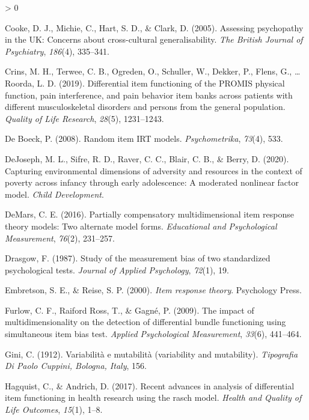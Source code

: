 \documentclass[
  english,
  man,floatsintext]{apa6}
\newlength{\cslhangindent}
\newenvironment{CSLReferences}[2] %
 {%
  \setlength{\parindent}{0pt}
  \ifodd #1 \everypar{\setlength{\hangindent}{\cslhangindent}}\ignorespaces\fi
  \ifnum #2 > 0
  \setlength{\parskip}{#2\baselineskip}
  \fi
 }%
 {}
\begin{document}
\begin{CSLReferences}{1}{0}
\leavevmode\hypertarget{ref-cooke2005assessing}{}%
Cooke, D. J., Michie, C., Hart, S. D., \& Clark, D. (2005). Assessing psychopathy in the UK: Concerns about cross-cultural generalisability. \emph{The British Journal of Psychiatry}, \emph{186}(4), 335--341.

\leavevmode\hypertarget{ref-crins2019differential}{}%
Crins, M. H., Terwee, C. B., Ogreden, O., Schuller, W., Dekker, P., Flens, G., \ldots{} Roorda, L. D. (2019). Differential item functioning of the PROMIS physical function, pain interference, and pain behavior item banks across patients with different musculoskeletal disorders and persons from the general population. \emph{Quality of Life Research}, \emph{28}(5), 1231--1243.

\leavevmode\hypertarget{ref-de2008random}{}%
De Boeck, P. (2008). Random item IRT models. \emph{Psychometrika}, \emph{73}(4), 533.

\leavevmode\hypertarget{ref-dejosephcapturing}{}%
DeJoseph, M. L., Sifre, R. D., Raver, C. C., Blair, C. B., \& Berry, D. (2020). Capturing environmental dimensions of adversity and resources in the context of poverty across infancy through early adolescence: A moderated nonlinear factor model. \emph{Child Development}.

\leavevmode\hypertarget{ref-demars2016partially}{}%
DeMars, C. E. (2016). Partially compensatory multidimensional item response theory models: Two alternate model forms. \emph{Educational and Psychological Measurement}, \emph{76}(2), 231--257.

\leavevmode\hypertarget{ref-drasgow1987study}{}%
Drasgow, F. (1987). Study of the measurement bias of two standardized psychological tests. \emph{Journal of Applied Psychology}, \emph{72}(1), 19.

\leavevmode\hypertarget{ref-embretson2013item}{}%
Embretson, S. E., \& Reise, S. P. (2000). \emph{Item response theory}. Psychology Press.

\leavevmode\hypertarget{ref-furlow2009impact}{}%
Furlow, C. F., Raiford Ross, T., \& Gagné, P. (2009). The impact of multidimensionality on the detection of differential bundle functioning using simultaneous item bias test. \emph{Applied Psychological Measurement}, \emph{33}(6), 441--464.

\leavevmode\hypertarget{ref-gini1912variabilita}{}%
Gini, C. (1912). Variabilit{à} e mutabilit{à} (variability and mutability). \emph{Tipografia Di Paolo Cuppini, Bologna, Italy}, 156.

\leavevmode\hypertarget{ref-hagquist2017recent}{}%
Hagquist, C., \& Andrich, D. (2017). Recent advances in analysis of differential item functioning in health research using the rasch model. \emph{Health and Quality of Life Outcomes}, \emph{15}(1), 1--8.


\end{CSLReferences}
\end{document}
